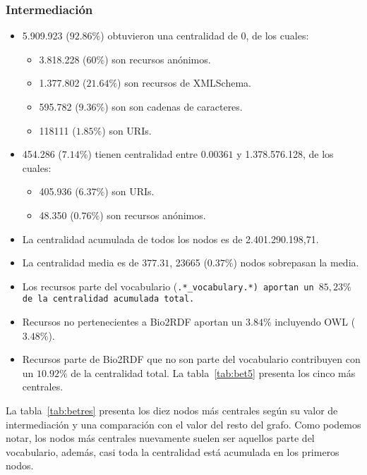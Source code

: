 \subsubsection{Intermediación}
\begin{itemize}
  \item 5.909.923 ($92.86\%$) obtuvieron una centralidad de 0, de los cuales:
    \begin{itemize}
      \item 3.818.228 ($60\%$) son recursos anónimos.
      \item 1.377.802 ($21.64\%$) son recursos de XMLSchema.
      \item 595.782 ($9.36\%$) son son cadenas de caracteres.
      \item 118111 ($1.85\%$) son URIs.
    \end{itemize}
  \item
    454.286 ($7.14\%$) tienen centralidad entre $0.00361$ y 1.378.576.128, de
    los cuales:
    \begin{itemize}
      \item 405.936 ($6.37\%$) son URIs.
      \item 48.350 ($0.76\%$) son recursos anónimos.
    \end{itemize}
  \item La centralidad acumulada de todos los nodos es de 2.401.290.198,71.
  \item
    La centralidad media es de $377.31$, 23665 ($0.37\%$) nodos sobrepasan
    la media.
  \item 
    Los recursos parte del vocabulario (\tt{.*\_vocabulary.*}) aportan un 
    $85,23\%$ de la centralidad acumulada total.
  \item
    Recursos no pertenecientes a Bio2RDF aportan un $3.84\%$ incluyendo OWL 
    ($3.48\%$).
  \item 
    Recursos parte de Bio2RDF que no son parte del vocabulario contribuyen con
    un $10.92\%$ de la centralidad total. La tabla~\ref{tab:bet5} presenta los
    cinco más centrales.
\end{itemize}

La tabla~\ref{tab:betres} presenta los diez nodos más centrales según su valor
de intermediación y una comparación con el valor del resto del grafo.
Como podemos notar, los nodos más centrales nuevamente suelen ser aquellos parte
del vocabulario, además, casi toda la centralidad está acumulada en los primeros
nodos.

